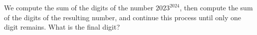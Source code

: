 We compute the sum of the digits of the number $2023^{2024}$, then compute the sum of the digits of the resulting number, and continue this process until only one digit remains. What is the final digit?
